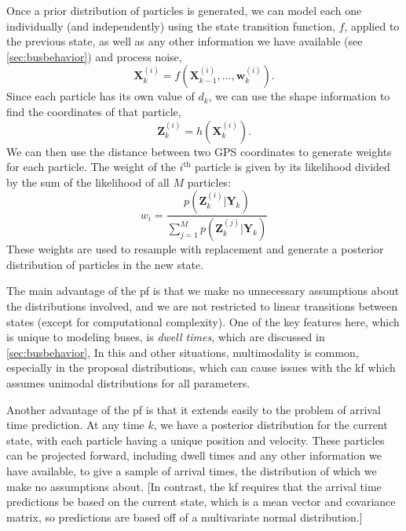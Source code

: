 \documentclass[12pt,a4paper]{article}
\newcommand{\bY}{\mathbf{Y}}
\newcommand{\bX}{\mathbf{X}}
\newcommand{\bZ}{\mathbf{Z}}
\newcommand{\mat}[1]{\mathbf{#1}}
\begin{document}
Once a prior distribution of particles is generated, 
we can model each one individually (and independently) using the state transition function, $f$,
applied to the previous state,
as well as any other information we have available (see \cref{sec:busbehavior}) and process noise,
\begin{equation}
  \label{eq:pf_statetransition}
  \bX_k^{(i)} = f(\bX_{k-1}^{(i)}, \ldots, \mat{w}_k^{(i)}).
\end{equation}
Since each particle has its own value of $d_k$, we can use the shape information to
find the coordinates of that particle,
\begin{equation}
  \label{eq:pf_measurement}
  \bZ_k^{(i)} = h(\bX_k^{(i)}).
\end{equation}
We can then use the distance between two GPS coordinates %
to generate weights for each particle.
The weight of the $i^{\mathrm{th}}$ particle is given by its likelihood divided by the sum of the likelihood
of all $M$ particles:
\begin{equation}
  \label{eq:pf_likelihood}
  w_i = \frac{p(\bZ_k^{(i)} | \bY_k)}{\sum_{j=1}^M p(\bZ_k^{(j)} | \bY_k)}
\end{equation}
These weights are used to resample with replacement and generate a posterior distribution 
of particles in the new state.


The main advantage of the \gls{pf} is that we make no unnecessary assumptions about the distributions
involved, and we are not restricted to linear transitions between states (except for computational
complexity).
One of the key features here, which is unique to modeling buses, 
is \emph{dwell times}, which are discussed in \cref{sec:busbehavior},
In this and other situations, multimodality is common, 
especially in the proposal distributions, 
which can cause issues with the \gls{kf} 
which assumes unimodal distributions for all parameters.


Another advantage of the \gls{pf} is that it extends easily to the problem of arrival time prediction.
At any time $k$, we have a posterior distribution for the current state,
with each particle having a unique position and velocity. 
These particles can be projected forward, including dwell times and any other information
we have available, to give a sample of arrival times, 
the distribution of which we make no assumptions about.
[In contrast, the \gls{kf} requires that the arrival time predictions be based on the current state,
which is a mean vector and covariance matrix, 
so predictions are based off of a multivariate normal distribution.]
\end{document}
